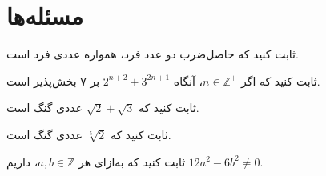 \section{مسئله‌ها}

\begin{problem}
	ثابت کنید که حاصل‌ضرب دو عدد فرد، همواره عددی فرد است.
\end{problem}

\begin{problem}
	ثابت کنید که اگر
	$n \in \mathbb{Z}^+$،
	آنگاه
	$2^{n+2}+3^{2n+1}$
	بر ۷ بخش‌پذیر است.
\end{problem}

\begin{problem}
	ثابت کنید که
	$\sqrt{2} + \sqrt{3}$
	عددی گنگ است.
\end{problem}

\begin{problem}
	ثابت کنید که
	$\sqrt[5]{2}$
	عددی گنگ است.
\end{problem}

\begin{problem}
	ثابت کنید که به‌ازای هر
	$a,b \in \mathbb{Z}$،
	داریم
	$12a^2-6b^2 \neq 0$.
\end{problem}
